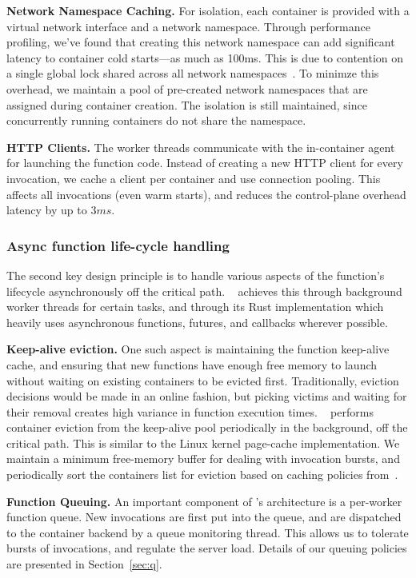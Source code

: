 \noindent \textbf{Network Namespace Caching.}
For isolation, each container is provided with a virtual network interface and a network namespace.
Through performance profiling, we've found that creating this network namespace can add significant latency to container cold starts---as much as 100ms.
This is due to contention on a single global lock shared across all network namespaces~\cite{oakes_sock_2018}. 
To minimze this overhead, we maintain a pool of pre-created network namespaces that are assigned during container creation. 
The isolation is still maintained, since concurrently running containers do not share the namespace. 

\noindent \textbf{HTTP Clients.}
The worker threads communicate with the in-container agent for launching the function code.
Instead of creating a new HTTP client for every invocation, we cache a client per container and use connection pooling. 
This affects all invocations (even warm starts), and reduces the control-plane overhead latency by up to $3ms$. 

\subsubsection{Async function life-cycle handling}

The second key design principle is to handle various aspects of the function's lifecycle asynchronously off the critical path.
\sysname~ achieves this through background worker threads for certain tasks, and through its Rust implementation which heavily uses asynchronous functions, futures, and callbacks wherever possible. 

\noindent \textbf{Keep-alive eviction.}
One such aspect is maintaining the function keep-alive cache, and ensuring that new functions have enough free memory to launch without waiting on existing containers to be evicted first.
Traditionally, eviction decisions would be made in an online fashion, but picking victims and waiting for their removal creates high variance in function execution times. 
\sysname~ performs container eviction from the keep-alive pool  periodically in the background, off the critical path. 
This is similar to the Linux kernel page-cache implementation. 
We maintain a minimum free-memory buffer for dealing with invocation bursts, and periodically sort the containers list for eviction based on caching policies from~\cite{faascache-asplos21}. 

\noindent \textbf{Function Queuing.}
An important component of \sysname's architecture is a per-worker function queue.
New invocations are first put into the queue, and are dispatched to the container backend by a queue monitoring thread. 
This allows us to tolerate bursts of invocations, and regulate the server load. 
Details of our queuing policies are presented in Section~\ref{sec:q}.

